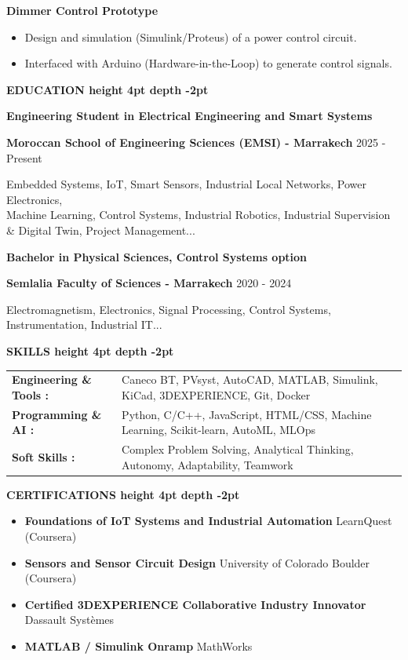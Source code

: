 \documentclass[10pt,a4paper]{altacv}
\renewcommand{\cvsection}[2][]{%
  \vspace{3pt}%
  {\color{heading}\LARGE\bfseries #2 \hspace{0.2em}\leaders\vrule height 4pt depth -2pt\hfill\mbox{}}\par\vspace{2pt}
}
\renewcommand{\cvevent}[4]{%
  {\large\bfseries\color{accent}#1\par}
  \smallskip\normalsize
  \ifstrequal{#2}{}{}{%
    \textbf{\color{emphasis}#2\ifstrequal{#4}{}{}{ - #4}}%
  }%
  \hfill
  \ifstrequal{#3}{}{}{{\small#3}}%
  \par\smallskip
}
\begin{document}
{\large\bfseries\color{accent} Dimmer Control Prototype}\\[0.05cm]
\begin{itemize}
  \item Design and simulation (Simulink/Proteus) of a power control circuit.
  \item Interfaced with Arduino (Hardware-in-the-Loop) to generate control signals.
\end{itemize}

\cvsection{EDUCATION}
\cvevent{Engineering Student in Electrical Engineering and Smart Systems}{Moroccan School of Engineering Sciences (EMSI)}{2025 - Present}{Marrakech}
\small Embedded Systems, IoT, Smart Sensors, Industrial Local Networks, Power Electronics,\\
\small Machine Learning, Control Systems, Industrial Robotics, Industrial Supervision \& Digital Twin, Project Management...

\cvevent{Bachelor in Physical Sciences, Control Systems option}{Semlalia Faculty of Sciences}{2020 - 2024}{Marrakech}
\small Electromagnetism, Electronics, Signal Processing, Control Systems, Instrumentation, Industrial IT...

\cvsection{SKILLS}
\begin{tabular}{@{}ll@{}}
\textbf{Engineering \& Tools :} & Caneco BT, PVsyst, AutoCAD, MATLAB, Simulink, KiCad, 3DEXPERIENCE, Git, Docker \\[2pt]
\textbf{Programming \& AI :} & Python, C/C++, JavaScript, HTML/CSS, Machine Learning, Scikit-learn, AutoML, MLOps \\[2pt]
\textbf{Soft Skills :} & Complex Problem Solving, Analytical Thinking, Autonomy, Adaptability, Teamwork \\
\end{tabular}

\cvsection{CERTIFICATIONS}
\begin{itemize}[leftmargin=*, label=\textbullet, itemsep=2pt]
  \item \textbf{Foundations of IoT Systems and Industrial Automation} \hfill {\color{emphasis}LearnQuest (Coursera)}
  \item \textbf{Sensors and Sensor Circuit Design} \hfill {\color{emphasis}University of Colorado Boulder (Coursera)}
  \item \textbf{Certified 3DEXPERIENCE Collaborative Industry Innovator} \hfill {\color{emphasis}Dassault Systèmes}
  \item \textbf{MATLAB / Simulink Onramp} \hfill {\color{emphasis}MathWorks}
\end{itemize}
\end{document}
